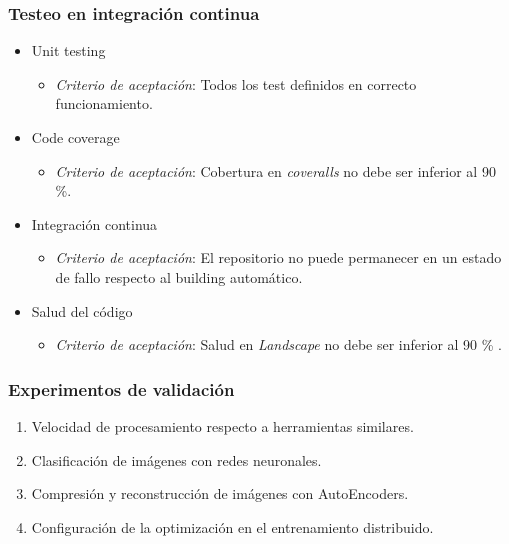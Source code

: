 \begin{frame}[t,fragile]
	\frametitle {Testeo en integración continua}
	
	\begin{itemize}
		\item Unit testing 
		\pause
		\begin{itemize}
			\item \textit{Criterio de aceptación}: Todos los test definidos en correcto funcionamiento.
		\end{itemize}	
		\pause
		\item Code coverage
		\pause
		\begin{itemize}
			\item \textit{Criterio de aceptación}: Cobertura en \textit{coveralls} no debe ser inferior al 90 \%.
		\end{itemize}
		\pause
		\item Integración continua
		\pause
		\begin{itemize}
			\item \textit{Criterio de aceptación}: El repositorio no puede permanecer en un estado de fallo respecto al building automático.
		\end{itemize}		
		\pause		
		\item Salud del código
		\pause
		\begin{itemize}
			\item \textit{Criterio de aceptación}: Salud en \textit{Landscape} no debe ser inferior al 90 \% .
		\end{itemize}
		
		
		
	\end{itemize}
	
	
	
\end{frame}


\begin{frame}[t,fragile]
	\frametitle {Experimentos de validación}
	
	\begin{enumerate}
		\item Velocidad de procesamiento respecto a herramientas similares.
		
		\item Clasificación de imágenes con redes neuronales.
		
		\item Compresión y reconstrucción de imágenes con AutoEncoders.
		
		\item Configuración de la optimización en el entrenamiento distribuido.
	\end{enumerate}
	
\end{frame}


